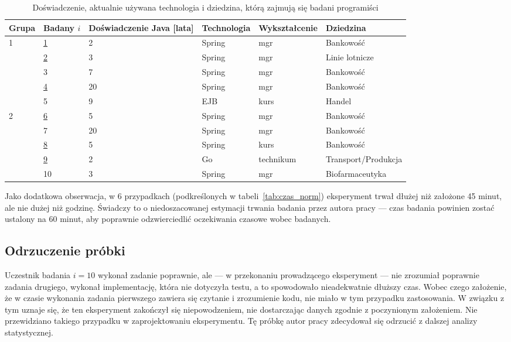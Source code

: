 \begin{table}[h]
    \centering
    \begin{tabular}{l|l|l|l|l|l}
        Grupa & Badany \(i\) & Doświadczenie Java [lata] & Technologia & Wykształcenie & Dziedzina
        \\ \hline\hline
        \multirow{5}{*}{1} & \underline{1} & 2 & Spring & mgr & Bankowość
        \\
        & \underline{2} & 3  & Spring & mgr       & Linie lotnicze      \\
        & 3             & 7  & Spring & mgr       & Bankowość           \\
        & \underline{4} & 20 & Spring & mgr       & Bankowość           \\
        & 5             & 9  & EJB    & kurs      & Handel              \\ \hline
        \multirow{5}{*}{2} & \underline{6} & 5 & Spring & mgr & Bankowość
        \\
        & 7             & 20 & Spring & mgr       & Bankowość           \\
        & \underline{8} & 5  & Spring & kurs      & Bankowość           \\
        & \underline{9} & 2  & Go     & technikum & Transport/Produkcja \\
        & 10            & 3  & Spring & mgr       & Biofarmaceutyka     \\ \hline
    \end{tabular}
    \caption{\label{tab:demografia}Doświadczenie, aktualnie używana technologia i dziedzina,
        którą zajmują się badani programiści}
\end{table}

Jako dodatkowa obserwacja, w 6 przypadkach (podkreślonych w
tabeli~\ref{tab:czas_norm}) eksperyment trwał dłużej niż założone 45 minut, ale
nie dużej niż godzinę.
Świadczy to o niedoszacowanej estymacji trwania badania przez autora pracy ---
czas badania powinien zostać ustalony na 60 minut, aby poprawnie odzwierciedlić
oczekiwania czasowe wobec badanych.

\subsection{Odrzuczenie próbki}

Uczestnik badania \(i = 10\) wykonał zadanie poprawnie, ale ---
w przekonaniu prowadzącego eksperyment --- nie zrozumiał poprawnie zadania
drugiego, wykonał implementację, która nie dotyczyła testu, a to spowodowało
nieadekwatnie dłuższy czas.
Wobec czego założenie, że w czasie wykonania zadania pierwszego zawiera się
czytanie i zrozumienie kodu, nie miało w tym przypadku zastosowania.
W związku z tym uznaje się, że ten eksperyment zakończył się niepowodzeniem,
nie dostarczając danych zgodnie z poczynionym założeniem.
Nie przewidziano takiego przypadku w zaprojektowaniu eksperymentu.
Tę próbkę autor pracy zdecydował się odrzucić z dalszej analizy statystycznej.

